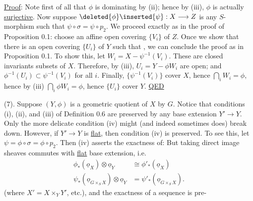 \uline{Proof}: Note first of all that $\phi$ is dominating by (ii); hence by (iii), $\phi$ is actually \uline{surjective}. Now suppose $\deleted{\phi}\inserted{\psi}:X\longrightarrow Z$ is any $S$-morphism such that $\psi\circ\sigma=\psi\circ p_2$. We proceed exactly as in the proof of Proposition 0.1: choose an affine open covering $\{V_i\}$ of $Z$. Once we show that there is an open covering $\{U_i\}$ of $Y$ such that
,
we can conclude the proof as in Proposition 0.1. To show this, let $W_i=X-\psi^{-1}(V_i)$. These are closed invariants subsets of $X$. Therefore, by (iii), $U_i=Y-\phi W_i$ are open; and $\phi^{-1}(U_i)\subset\psi^{-1}(V_i)$ for all $i$. Finally, $\{\psi^{-1}(V_i)\}$ cover $X$, hence $\bigcap_iW_i=\phi$, hence by (iii) $\bigcap_i\phi W_i=\phi$, hence $\{U_i\}$ cover $Y$. \uline{QED}

(7). Suppose $(Y,\phi)$ is a geometric quotient of $X$ by $G$. Notice that conditions (i), (ii), and (iii) of Definition 0.6 are preserved by any base extension $Y'\to Y$. Only the more delicate condition (iv) might (and indeed sometimes does) break down. However, if $Y'\longrightarrow Y$ is \uline{flat}, then condition (iv) is preserved. To see this, let $\psi=\phi\circ\sigma=\phi\circ p_2$. Then (iv) asserts the exactness of:
But taking direct image sheaves commutes with \uline{flat} base extension, i.e.
\[
\begin{aligned}
\phi_*(\underline o_X)\otimes\underline o_Y&\cong\phi'_*(\underline o_X)\\
\psi_*(\underline o_{G\times_S X})\otimes\underline o_Y&=\psi'_*(\underline o_{G\times_S X}).
\end{aligned}
\]
(where $X'=X\times_Y Y'$, etc.), and the exactness of a sequence is pre-
